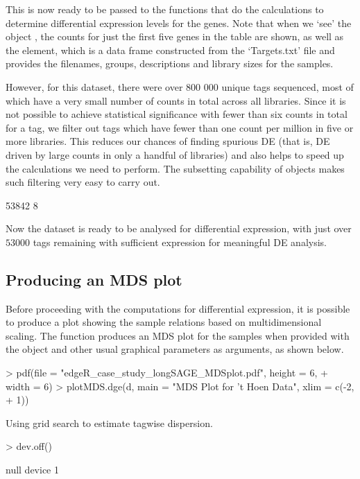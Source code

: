 This  is now ready to be passed to the functions that do
the calculations to determine differential expression levels for the
genes. Note that when we `see' the  object , the
counts for just the first five genes in the table are shown, as well
as the  element, which is a data frame constructed from
the `Targets.txt' file and provides the filenames, groups,
descriptions and library sizes for the samples.

However, for this dataset, there were over 800 000 unique tags
sequenced, most of which have a very small number of counts in total
across all libraries. Since it is not possible to achieve statistical
significance with fewer than six counts in total for a tag, we filter
out tags which have fewer than one count per million in five or more
libraries.  This reduces our chances of finding spurious DE (that is,
DE driven by large counts in only a handful of libraries) and also
helps to speed up the calculations we need to perform. The subsetting
capability of  objects makes such filtering very easy to
carry out.

\begin{Schunk}
\begin{Soutput}
[1] 53842     8
\end{Soutput}
\end{Schunk}

Now the dataset is ready to be analysed for differential expression,
with just over $53000$ tags remaining with sufficient expression for
meaningful DE analysis.


\subsection{Producing an MDS plot}
Before proceeding with the computations for differential expression,
it is possible to produce a plot showing the sample relations based on
multidimensional scaling. The function  produces an
MDS plot for the samples when provided with the  object
and other usual graphical parameters as arguments, as shown below.

\begin{Schunk}
\begin{Sinput}
> pdf(file = "edgeR_case_study_longSAGE_MDSplot.pdf", height = 6, 
+     width = 6)
> plotMDS.dge(d, main = "MDS Plot for 't Hoen Data", xlim = c(-2, 
+     1))
\end{Sinput}
\begin{Soutput}
Using grid search to estimate tagwise dispersion. 
\end{Soutput}
\begin{Sinput}
> dev.off()
\end{Sinput}
\begin{Soutput}
null device 
          1 
\end{Soutput}
\end{Schunk}

